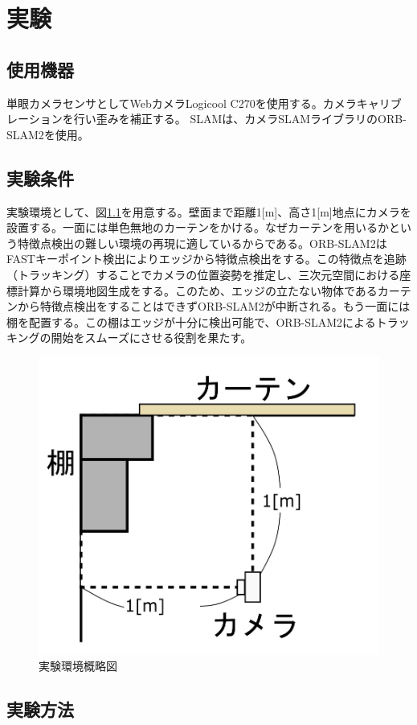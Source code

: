 \chapter{実験}\label{chap:test}

\section{使用機器}

単眼カメラセンサとしてWebカメラLogicool C270を使用する。カメラキャリブレーションを行い歪みを補正する。
SLAMは、カメラSLAMライブラリのORB-SLAM2\cite{Artal32017}を使用。


\section{実験条件}

実験環境として、図\ref{fig:picture01}を用意する。壁面まで距離1[m]、高さ1[m]地点にカメラを設置する。一面には単色無地のカーテンをかける。なぜカーテンを用いるかという特徴点検出の難しい環境の再現に適しているからである。ORB-SLAM2はFASTキーポイント検出\cite{Hujiyosi2011}によりエッジから特徴点検出をする\cite{Artal22017}。この特徴点を追跡（トラッキング）することでカメラの位置姿勢を推定し、三次元空間における座標計算から環境地図生成をする。このため、エッジの立たない物体であるカーテンから特徴点検出をすることはできずORB-SLAM2が中断される。もう一面には棚を配置する。この棚はエッジが十分に検出可能で、ORB-SLAM2によるトラッキングの開始をスムーズにさせる役割を果たす。

\begin{figure}[h]
        \begin{center}
        \includegraphics[width=0.35\linewidth]{figs/picture01.jpg}
        \caption{実験環境概略図}
        \label{fig:picture01}
        \end{center}
\end{figure}

\newpage

\section{実験方法}

